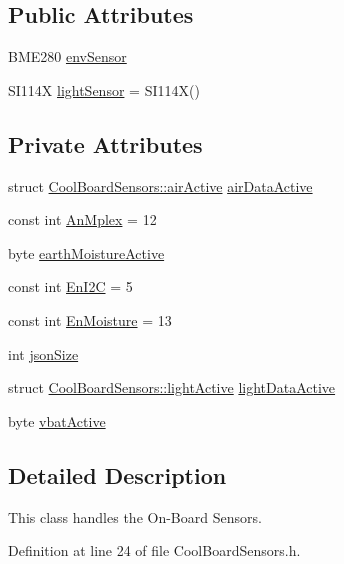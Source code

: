 \subsection*{Public Attributes}
\begin{DoxyCompactItemize}
\item 
B\+M\+E280 \hyperlink{classCoolBoardSensors_a868e38985e9a2412829fa2790ca13e2e}{env\+Sensor}
\item 
S\+I114X \hyperlink{classCoolBoardSensors_a3e397300fb707dd193e909a757bf6102}{light\+Sensor} = S\+I114X()
\end{DoxyCompactItemize}
\subsection*{Private Attributes}
\begin{DoxyCompactItemize}
\item 
struct \hyperlink{structCoolBoardSensors_1_1airActive}{Cool\+Board\+Sensors\+::air\+Active} \hyperlink{classCoolBoardSensors_abff8dfeccb2f7689847bb64d5f1cd31e}{air\+Data\+Active}
\item 
const int \hyperlink{classCoolBoardSensors_a12ef28b1046219e0aee10bf64e28c4a5}{An\+Mplex} = 12
\item 
byte \hyperlink{classCoolBoardSensors_a46dfddb8a12720e92cd2825ef09023c8}{earth\+Moisture\+Active}
\item 
const int \hyperlink{classCoolBoardSensors_aaa6b5dbf3a6633bffd9d204d961096dc}{En\+I2C} = 5
\item 
const int \hyperlink{classCoolBoardSensors_a6177d02e14a057a2f171a2e930b5038d}{En\+Moisture} = 13
\item 
int \hyperlink{classCoolBoardSensors_a05a40dc80bfff14ffb830f549b876f8d}{json\+Size}
\item 
struct \hyperlink{structCoolBoardSensors_1_1lightActive}{Cool\+Board\+Sensors\+::light\+Active} \hyperlink{classCoolBoardSensors_ac4deb1cf41bac8b91c780c92fab00ba4}{light\+Data\+Active}
\item 
byte \hyperlink{classCoolBoardSensors_af5039ad760b0ff0aa7eee16c55e81702}{vbat\+Active}
\end{DoxyCompactItemize}


\subsection{Detailed Description}
This class handles the On-\/\+Board Sensors. 

Definition at line 24 of file Cool\+Board\+Sensors.\+h.



